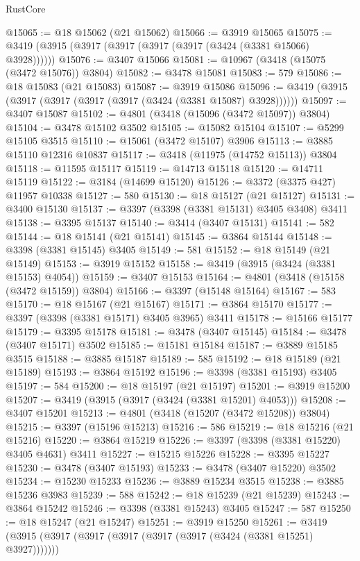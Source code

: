 \begin{lexlean}{RustCore}
\begin{coremodule}
@15065 := @18 @15062 (@21 @15062)
@15066 := @3919 @15065
@15075 := @3419 (@3915 (@3917 (@3917 (@3917 (@3917 (@3424 (@3381 @15066) @3928))))))
@15076 := @3407 @15066
@15081 := @10967 (@3418 (@15075 (@3472 @15076)) @3804)
@15082 := @3478 @15081
@15083 := 579
@15086 := @18 @15083 (@21 @15083)
@15087 := @3919 @15086
@15096 := @3419 (@3915 (@3917 (@3917 (@3917 (@3917 (@3424 (@3381 @15087) @3928))))))
@15097 := @3407 @15087
@15102 := @4801 (@3418 (@15096 (@3472 @15097)) @3804)
@15104 := @3478 @15102 @3502
@15105 := @15082 @15104
@15107 := @5299 @15105 @3515
@15110 := @15061 (@3472 @15107) @3906
@15113 := @3885 @15110 @12316 @10837
@15117 := @3418 (@11975 (@14752 @15113)) @3804
@15118 := @11595 @15117
@15119 := @14713 @15118
@15120 := @14711 @15119
@15122 := @3184 (@14699 @15120)
@15126 := @3372 (@3375 @427) @11957 @10338
@15127 := 580
@15130 := @18 @15127 (@21 @15127)
@15131 := @3400 @15130
@15137 := @3397 (@3398 (@3381 @15131) @3405 @3408) @3411
@15138 := @3395 @15137
@15140 := @3414 (@3407 @15131)
@15141 := 582
@15144 := @18 @15141 (@21 @15141)
@15145 := @3864 @15144
@15148 := @3398 (@3381 @15145) @3405
@15149 := 581
@15152 := @18 @15149 (@21 @15149)
@15153 := @3919 @15152
@15158 := @3419 (@3915 (@3424 (@3381 @15153) @4054))
@15159 := @3407 @15153
@15164 := @4801 (@3418 (@15158 (@3472 @15159)) @3804)
@15166 := @3397 (@15148 @15164)
@15167 := 583
@15170 := @18 @15167 (@21 @15167)
@15171 := @3864 @15170
@15177 := @3397 (@3398 (@3381 @15171) @3405 @3965) @3411
@15178 := @15166 @15177
@15179 := @3395 @15178
@15181 := @3478 (@3407 @15145)
@15184 := @3478 (@3407 @15171) @3502
@15185 := @15181 @15184
@15187 := @3889 @15185 @3515
@15188 := @3885 @15187
@15189 := 585
@15192 := @18 @15189 (@21 @15189)
@15193 := @3864 @15192
@15196 := @3398 (@3381 @15193) @3405
@15197 := 584
@15200 := @18 @15197 (@21 @15197)
@15201 := @3919 @15200
@15207 := @3419 (@3915 (@3917 (@3424 (@3381 @15201) @4053)))
@15208 := @3407 @15201
@15213 := @4801 (@3418 (@15207 (@3472 @15208)) @3804)
@15215 := @3397 (@15196 @15213)
@15216 := 586
@15219 := @18 @15216 (@21 @15216)
@15220 := @3864 @15219
@15226 := @3397 (@3398 (@3381 @15220) @3405 @4631) @3411
@15227 := @15215 @15226
@15228 := @3395 @15227
@15230 := @3478 (@3407 @15193)
@15233 := @3478 (@3407 @15220) @3502
@15234 := @15230 @15233
@15236 := @3889 @15234 @3515
@15238 := @3885 @15236 @3983
@15239 := 588
@15242 := @18 @15239 (@21 @15239)
@15243 := @3864 @15242
@15246 := @3398 (@3381 @15243) @3405
@15247 := 587
@15250 := @18 @15247 (@21 @15247)
@15251 := @3919 @15250
@15261 := @3419 (@3915 (@3917 (@3917 (@3917 (@3917 (@3917 (@3424 (@3381 @15251) @3927)))))))

\end{coremodule}
\end{lexlean}
